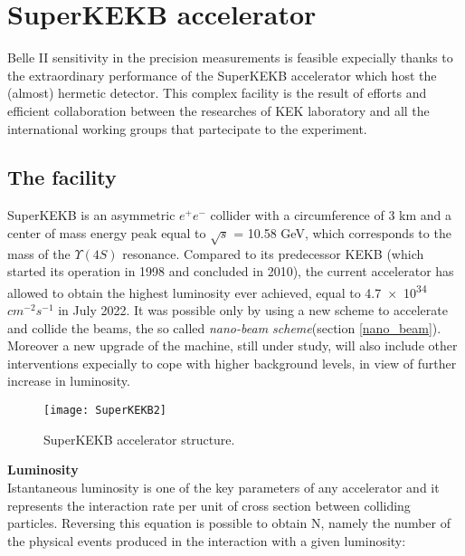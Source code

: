


\section{SuperKEKB accelerator}

Belle II sensitivity in the precision measurements is feasible expecially thanks to the extraordinary performance of the SuperKEKB accelerator which host the (almost) hermetic detector. This complex facility is the result of efforts and efficient collaboration between the researches of KEK laboratory and all the international working groups that partecipate to the experiment.


\subsection{The facility}

SuperKEKB is an asymmetric $e^{+}e^{-}$ collider with a circumference of 3 km and a center of mass energy peak equal to  $\sqrt{s}$ = 10.58 GeV, which corresponds to the mass of the $\Upsilon(4S)$ resonance.
Compared to its predecessor KEKB (which started its operation in 1998 and concluded in 2010), the current accelerator has allowed to obtain the highest luminosity ever achieved, equal to \num{4.7e34} $cm^{-2}s^{-1}$ in July 2022. It was possible only by using a new scheme to accelerate and collide the beams, the so called \textit{nano-beam scheme}(section \vref{nano_beam}). Moreover a new upgrade of the machine, still under study, will also include other interventions expecially to cope with higher background levels, in view of further increase in luminosity.

\begin{figure}[h!]
\centering
\texttt{[image: SuperKEKB2]}
\caption{SuperKEKB accelerator structure.}
\label{fig:superkekb}
\end{figure}



\textbf{Luminosity}\\

Istantaneous luminosity is one of the key parameters of any accelerator and it represents the interaction rate per unit of cross section between colliding particles. Reversing this equation is possible to obtain N, namely the number of the physical events produced in the interaction with a given luminosity:

